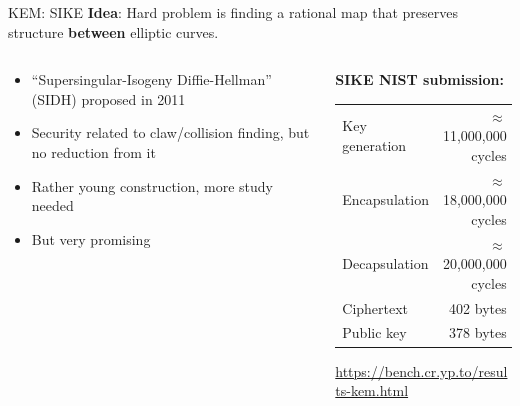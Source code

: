\documentclass[xcolor=table,10pt,aspectratio=169]{beamer}
\begin{document}
\begin{frame}[label={sec:org5dd59b7}]{KEM: SIKE}
\textbf{Idea}: Hard problem is finding a rational map that preserves structure \textbf{between} elliptic curves.

\begin{columns}[t]
\begin{column}{0.5\columnwidth}
\begin{itemize}
\item “Supersingular-Isogeny Diffie-Hellman” (SIDH) proposed in 2011
\item Security related to claw/collision finding, but no reduction from it
\item Rather young construction, more study needed
\item But very promising
\end{itemize}
\end{column}

\begin{column}{0.5\columnwidth}
\textbf{SIKE NIST submission:}

\begin{center}
\begin{tabular}{lr}
Key generation & \(\approx\) 11,000,000 cycles\\
Encapsulation & \(\approx\) 18,000,000 cycles\\
Decapsulation & \(\approx\) 20,000,000 cycles\\
Ciphertext & 402 bytes\\
Public key & 378 bytes\\
\end{tabular}

\end{center}

\small \url{https://bench.cr.yp.to/results-kem.html}
\end{column}
\end{columns}
\end{frame}
\end{document}
